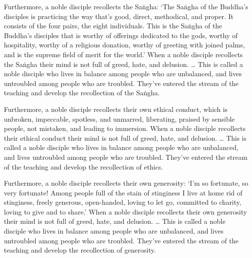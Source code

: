 \documentclass[12pt,openany]{book}%
\begin{document}
Furthermore, a noble disciple recollects the \textsanskrit{Saṅgha}: ‘The \textsanskrit{Saṅgha} of the Buddha’s disciples is practicing the way that’s good, direct, methodical, and proper. It consists of the four pairs, the eight individuals. This is the \textsanskrit{Saṅgha} of the Buddha’s disciples that is worthy of offerings dedicated to the gods, worthy of hospitality, worthy of a religious donation, worthy of greeting with joined palms, and is the supreme field of merit for the world.’ When a noble disciple recollects the \textsanskrit{Saṅgha} their mind is not full of greed, hate, and delusion. … This is called a noble disciple who lives in balance among people who are unbalanced, and lives untroubled among people who are troubled. They’ve entered the stream of the teaching and develop the recollection of the \textsanskrit{Saṅgha}. 

Furthermore, a noble disciple recollects their own ethical conduct, which is unbroken, impeccable, spotless, and unmarred, liberating, praised by sensible people, not mistaken, and leading to immersion. When a noble disciple recollects their ethical conduct their mind is not full of greed, hate, and delusion. … This is called a noble disciple who lives in balance among people who are unbalanced, and lives untroubled among people who are troubled. They’ve entered the stream of the teaching and develop the recollection of ethics. 

Furthermore, a noble disciple recollects their own generosity: ‘I’m so fortunate, so very fortunate! Among people full of the stain of stinginess I live at home rid of stinginess, freely generous, open-handed, loving to let go, committed to charity, loving to give and to share.’ When a noble disciple recollects their own generosity their mind is not full of greed, hate, and delusion. … This is called a noble disciple who lives in balance among people who are unbalanced, and lives untroubled among people who are troubled. They’ve entered the stream of the teaching and develop the recollection of generosity. 
\end{document}
